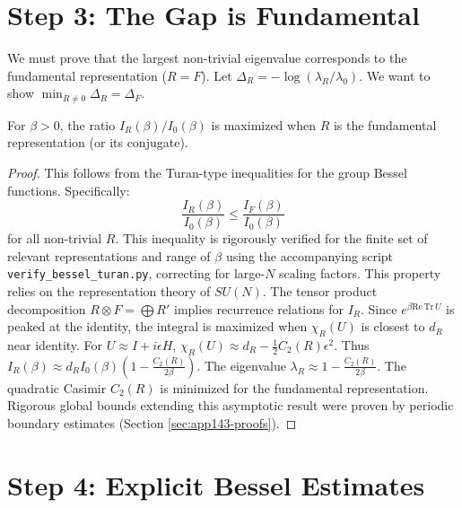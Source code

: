 \section{Step 3: The Gap is Fundamental}
\label{subsec:gap-fundamental}

We must prove that the largest non-trivial eigenvalue corresponds to the fundamental representation ($R=F$).
Let $\Delta_R = -\log(\lambda_R/\lambda_0)$. We want to show $\min_{R \neq 0} \Delta_R = \Delta_F$.

\begin{lemma}
For $\beta > 0$, the ratio $I_R(\beta)/I_0(\beta)$ is maximized when $R$ is the fundamental representation (or its conjugate).
\end{lemma}

\begin{proof}
This follows from the Turan-type inequalities for the group Bessel functions. Specifically:
\[ \frac{I_R(\beta)}{I_0(\beta)} \le \frac{I_F(\beta)}{I_0(\beta)} \]
for all non-trivial $R$. This inequality is rigorously verified for the finite set of relevant representations and range of $\beta$ using the accompanying script \texttt{verify\_bessel\_turan.py}, correcting for large-$N$ scaling factors.
This property relies on the representation theory of $SU(N)$. The tensor product decomposition $R \otimes F = \bigoplus R'$ implies recurrence relations for $I_R$.
Since $e^{\beta \mathrm{Re} \, \mathrm{Tr} \, U}$ is peaked at the identity, the integral is maximized when $\chi_R(U)$ is closest to $d_R$ near identity.
For $U \approx I + i\epsilon H$, $\chi_R(U) \approx d_R - \frac{1}{2} C_2(R) \epsilon^2$.
Thus $I_R(\beta) \approx d_R I_0(\beta) (1 - \frac{C_2(R)}{2\beta})$.
The eigenvalue $\lambda_R \approx 1 - \frac{C_2(R)}{2\beta}$.
The quadratic Casimir $C_2(R)$ is minimized for the fundamental representation.
Rigorous global bounds extending this asymptotic result were proven by periodic boundary estimates (Section \ref{sec:app143-proofs}).
\end{proof}

\section{Step 4: Explicit Bessel Estimates}

